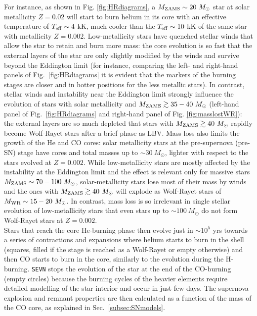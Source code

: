 \documentclass[a4paper,titlepage]{book}     	%
\newcommand{\sun}{\ensuremath{_\odot}}
\newcommand{\mzams}{M_\textup{ZAMS}}
\newcommand{\msun}{\ensuremath{M\sun}}
\begin{document}
For instance, as shown in Fig. \ref{fig:HRdiagrams}, a $\mzams \sim 20~\msun$ star at solar metallicity $Z=0.02$ will start to burn helium in its core with an effective temperature of $T_{\rm eff} \sim 4$ kK, much cooler than the $T_{\rm eff} \sim 10$ kK of the same star with metallicity $Z=0.002$. Low-metallicity stars have quenched stellar winds that allow the star to retain and burn more mass: the core evolution is so fast that the external layers of the star are only slightly modified by the winds and survive beyond the Eddington limit (for instance, comparing the left- and right-hand panels of Fig.\ \ref{fig:HRdiagrams} it is evident that the markers of the burning stages are closer and in hotter positions for the less metallic stars). In contrast, stellar winds and instability near the Eddington limit strongly influence the evolution of stars with solar metallicity and $\mzams \gtrsim 35-40~\msun$ (left-hand panel of Fig.\ \ref{fig:HRdiagrams} and right-hand panel of Fig. \ref{fig:masslostWR}): the external layers are so much depleted that stars with $\mzams \gtrsim 40~\msun$ rapidly become Wolf-Rayet stars after a brief phase as LBV. Mass loss also limits the growth of the He and CO cores: solar metallicity stars at the pre-supernova (pre-SN) stage have cores and total masses up to $\sim 30~\msun$, lighter with respect to the stars evolved at $Z=0.002$. While low-metallicity stars are mostly affected by the instability at the Eddington limit and the effect is relevant only for massive stars $\mzams \sim 70-100~\msun$, solar-metallicity stars lose most of their mass by winds and the ones with $\mzams \gtrsim 40~\msun$ will explode as Wolf-Rayet stars of $M_{\rm WR} \sim 15-20~\msun$. In contrast, mass loss is so irrelevant in single stellar evolution of low-metallicity stars that even stars up to $\sim 100~\msun$ do not form Wolf-Rayet stars at $Z=0.002$.\\

Stars that reach the core He-burning phase then evolve just in $\sim 10^{5}$ yrs towards a series of contractions and expansions where helium starts to burn in the shell (squares, filled if the stage is reached as a Wolf-Rayet or empty otherwise) and then CO starts to burn in the core, similarly to the evolution during the H-burning. \texttt{SEVN} stops the evolution of the star at the end of the CO-burning (empty circles) because the burning cycles of the heavier elements require detailed modelling of the star interior and occur in just few days. The supernova explosion and remnant properties are then calculated as a function of the mass of the CO core, as explained in Sec.\ \ref{subsec:SNmodels}.
\end{document}
